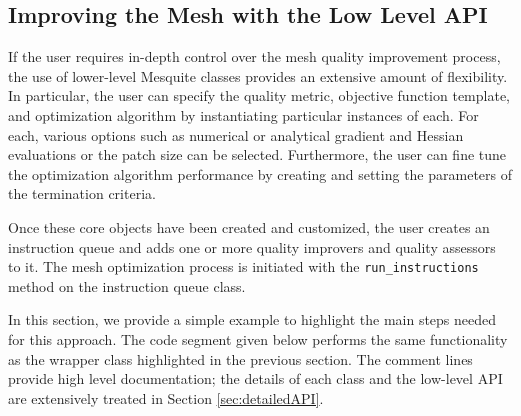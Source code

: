 \subsection{Improving the Mesh with the Low Level API}
\label{sec:tutDetailedAPI}
If the user requires in-depth control over the mesh quality improvement
process, the use of lower-level Mesquite classes provides an extensive
amount of flexibility.   In particular, the user can specify the quality
metric, objective function template, and optimization algorithm by
instantiating particular instances of each.  For each, various options
such as numerical or analytical gradient and Hessian evaluations or
the patch size can be selected.  Furthermore, the user can fine tune
the optimization algorithm performance by creating and setting the parameters 
of the termination criteria.

Once these core objects have been created and customized, the user
creates an instruction queue and adds one or more quality improvers
and quality assessors to it.  The mesh optimization process is initiated
with the {\tt run\_instructions} method on the instruction queue
class.

In this section, we provide a simple example to highlight the main
steps needed for this approach.  The code segment given below performs
the same functionality as the wrapper class highlighted in the
previous section.  The comment lines provide high level documentation;
the details of each class and the low-level API are extensively
treated in Section 
\ref{sec:detailedAPI}.

